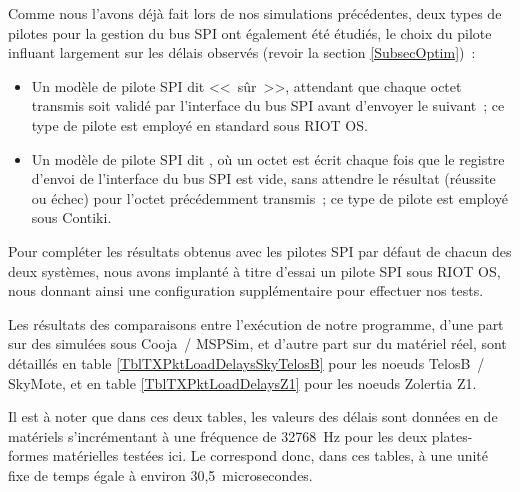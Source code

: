 Comme nous l'avons déjà fait lors de nos simulations précédentes,
deux types de pilotes pour la gestion du bus SPI ont également été
étudiés, le choix du pilote influant largement sur les délais observés
(revoir la section \vref{SubsecOptim})~:
\begin{itemize}
\item Un modèle de pilote SPI dit <<~sûr~>>, attendant que chaque octet
transmis soit validé par l'interface du bus SPI avant d'envoyer le
suivant~; ce type de pilote est employé en standard sous RIOT OS.
\item Un modèle de pilote SPI dit , où un octet est
écrit chaque fois que le registre d'envoi de l'interface du bus SPI
est vide, sans attendre le résultat (réussite ou échec) pour l'octet
précédemment transmis~; ce type de pilote est employé sous Contiki.
\end{itemize}

Pour compléter les résultats obtenus avec les pilotes SPI par défaut
de chacun des deux systèmes, nous avons implanté à titre d'essai
un pilote SPI  sous RIOT OS, nous donnant ainsi
une configuration supplémentaire pour effectuer nos tests.

Les résultats des comparaisons entre l'exécution de notre programme,
d'une part sur des  simulées sous Cooja~/ MSPSim, et
d'autre part sur du matériel réel, sont détaillés en table
\vref{TblTXPktLoadDelaysSkyTelosB} pour les noeuds TelosB~/ SkyMote,
et en table \vref{TblTXPktLoadDelaysZ1} pour les noeuds Zolertia Z1.

Il est à noter que dans ces deux tables, les valeurs des délais sont
données en  de  matériels s'incrémentant
à une fréquence de 32768~Hz pour les deux plates-formes matérielles
testées ici. Le  correspond donc, dans ces tables,
à une unité fixe de temps égale à environ 30,5~microsecondes.


\newcommand{\tabtitle}[1]{\multicolumn{8}{c}{\bfseries #1}}
\newcommand{\ticks}[1]{#1 \lang{ticks}}
\newcommand{\moy}[1]{#1 \ticks}
\newcommand{\ect}[1]{#1 \ticks}
\newcommand{\estus}[1]{($\approx$ #1 $\mu$sec.)}
\newcommand{\prctv}[1]{$\approx$ #1\% val. exp.}


